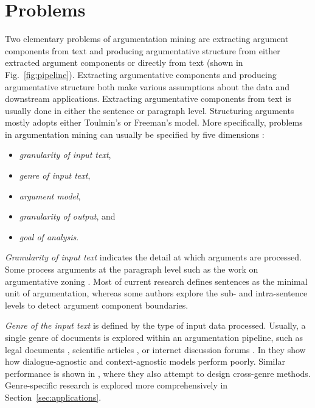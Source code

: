 \section{Problems}
\label{sec:problems}

Two elementary problems of argumentation mining are 
extracting argument components from text and producing argumentative structure
from either extracted argument components or directly from text
(shown in Fig.~\ref{fig:pipeline}). 
Extracting argumentative components and producing argumentative
structure both make various assumptions about the data and downstream
applications. 
Extracting argumentative components from text is usually done in either
the sentence or paragraph level. Structuring arguments mostly adopts either 
Toulmin's or Freeman's model.
More specifically, problems in argumentation mining can
usually be specified by five dimensions \citep{lippi2016argumentation}: 
\begin{itemize}
\item \emph{granularity of input text}, 
\item \emph{genre of input text}, 
\item \emph{argument model}, 
\item \emph{granularity of output}, and
\item \emph{goal of analysis}.
\end{itemize}

\emph{Granularity of input text} indicates the detail at which arguments
are processed. Some process arguments at the paragraph level 
such as the work on argumentative zoning
\citep{teufel2009towards}. Most of current research defines
sentences as the minimal unit of argumentation,
whereas some authors explore the sub- and intra-sentence levels
to detect argument component boundaries.

\emph{Genre of the input text} is defined by the type of input data processed.
Usually, a single genre of documents is explored within an argumentation
pipeline, such as legal documents \citep{palau2009argumentation}, scientific
articles \citep{teufel2009towards}, or internet discussion forums
\citep{hasan2014you, boltuzic2014back, habernal2017argumentation}.  In
\citep{budzynska2014towards} they show how dialogue-agnostic and
context-agnostic models perform poorly.  Similar performance is shown in
\citep{daxenberger2017essence}, where they also attempt to design cross-genre
methods. Genre-specific research is explored more comprehensively in 
Section~\ref{sec:applications}.

